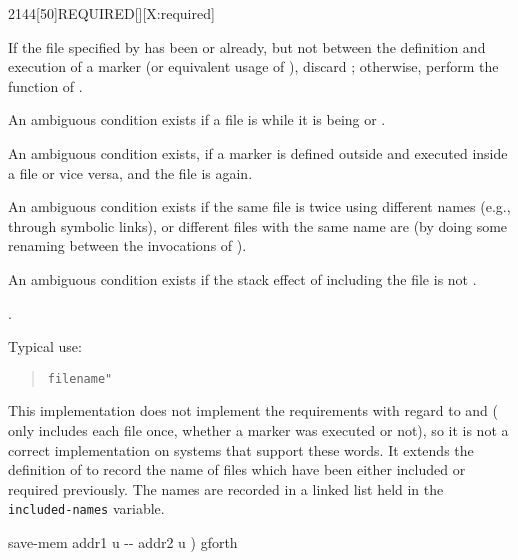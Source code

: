 \begin{worddef}{2144}[50]{REQUIRED}[][X:required]
\item {}

	If the file specified by  has been 
	or  already, but not between the definition and
	execution of a marker (or equivalent usage of ),
	discard ; otherwise, perform the function of
	.

	An ambiguous condition exists if a file is  while
	it is being  or .

	An ambiguous condition exists, if a marker is defined outside and
	executed inside a file or vice versa, and the file is
	 again.

	An ambiguous condition exists if the same file is 
	twice using different names (e.g., through symbolic links), or
	different files with the same name are  (by doing
	some renaming between the invocations of ).

	An ambiguous condition exists if the stack effect of including the
	file is not .

\see {}.

	\begin{rationale} %
		Typical use:
		\begin{quote}
			 \texttt{filename"} 
		\end{quote}
	\end{rationale}

	\begin{implement}
		\dffamily
		This implementation does not implement the requirements with
		regard to  and  (
		only includes each file once, whether a marker was executed or
		not), so it is not a correct implementation on systems that
		support these words. It extends the definition of 
		to record the name of files which have been either included or
		required previously. The names are recorded in a linked list
		held in the \texttt{included-names} variable.

		\ttfamily
		\word{:} save-mem	 addr1 u -{}- addr2 u )  gforth \\
		  \\
		\tab {}  \\
		\tab {}   \\
		\tab {}   \word{ROT}   \word{;} \\


\end{implement}
\end{worddef}
